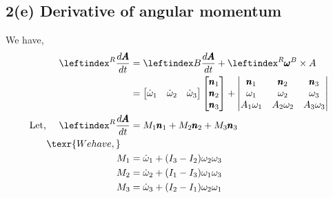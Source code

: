 \subsection{2(e) Derivative of angular momentum}
We have,
\begin{align*}
    \lx{^R}{\frac{d \pmb A}{d t}} &= \lx{B}{\frac{d \pmb A}{dt}} + \lx{^R}{\pmb \omega}^B \times A\\
    &=\bm{\dot \omega_1 & \dot \omega_2 & \dot \omega_3} \bm{\pmb n_1 \\ \pmb n_2 \\ \pmb n_3} +
    \left| \begin{matrix} \pmb n_1 & \pmb n_2 &\pmb n_3\\
            \omega_1 & \omega_2 & \omega_3\\
            A_1\omega_1 & A_2 \omega_2 & A_3 \omega_3\\
            \end{matrix} \right|\\
    \text{Let, } \quad \lx{^R}{\frac{d \pmb A}{d t}} &= M_1 \pmb n_1 + M_2 \pmb n_2+ M_3 \pmb n_3\\
    \texr{We have, } \quad &\\
    M_1 &= \dot \omega_1 + (I_3 - I_2) \omega_2 \omega_3\\
    M_2 &= \dot \omega_2 + (I_1 - I_3) \omega_1 \omega_3\\
    M_3 &= \dot \omega_3 + (I_2 - I_1) \omega_2 \omega_1\\
\end{align*}
